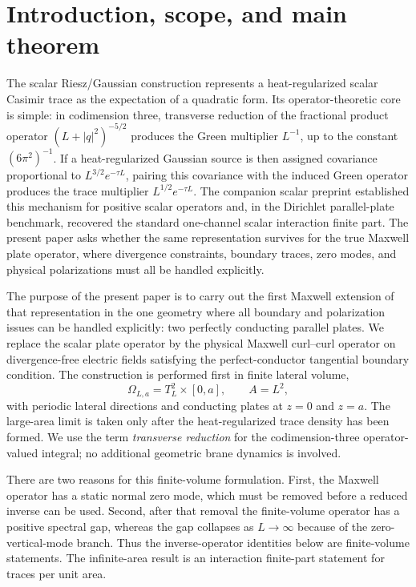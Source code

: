 \documentclass[11pt]{article}
\providecommand{\abs}[1]{\left\lvert #1\right\rvert}
\providecommand{\OmegaLa}{\Omega_{L,a}}
\providecommand{\TtwoL}{T_L^2}
\providecommand{\Aarea}{A}
\numberwithin{equation}{section}
\begin{document}
\section{Introduction, scope, and main theorem}
\label{sec:introduction-scope-theorem}

The scalar Riesz/Gaussian construction represents a heat-regularized scalar
Casimir trace as the expectation of a quadratic form.  Its operator-theoretic
core is simple: in codimension three, transverse reduction of the fractional
product operator \((L+\abs q^2)^{-5/2}\) produces the Green multiplier
\(L^{-1}\), up to the constant \((6\pi^2)^{-1}\).  If a heat-regularized
Gaussian source is then assigned covariance proportional to
\(L^{3/2}e^{-\tau L}\), pairing this covariance with the induced Green
operator produces the trace multiplier \(L^{1/2}e^{-\tau L}\).
The companion scalar preprint \cite{KhanKhan2026Scalar} established this
mechanism for positive scalar operators and, in the Dirichlet parallel-plate
benchmark, recovered the standard one-channel scalar interaction finite part.
The present paper asks whether the same representation survives for the true
Maxwell plate operator, where divergence constraints, boundary traces, zero
modes, and physical polarizations must all be handled explicitly.

The purpose of the present paper is to carry out the first Maxwell extension of
that representation in the one geometry where all boundary and polarization
issues can be handled explicitly: two perfectly conducting parallel plates.  We
replace the scalar plate operator by the physical Maxwell curl--curl operator
on divergence-free electric fields satisfying the perfect-conductor tangential
boundary condition.  The construction is performed first in finite lateral
volume,
\[
    \OmegaLa=\TtwoL\times[0,a],
    \qquad \Aarea=L^2,
\]
with periodic lateral directions and conducting plates at \(z=0\) and
\(z=a\).  The large-area limit is taken only after the heat-regularized trace
density has been formed.  We use the term \emph{transverse reduction} for the
codimension-three operator-valued integral; no additional geometric brane
dynamics is involved.

There are two reasons for this finite-volume formulation.  First, the Maxwell
operator has a static normal zero mode, which must be removed before a reduced
inverse can be used.  Second, after that removal the finite-volume operator has
a positive spectral gap, whereas the gap collapses as \(L\to\infty\) because of
the zero-vertical-mode branch.  Thus the inverse-operator identities below are
finite-volume statements.  The infinite-area result is an interaction
finite-part statement for traces per unit area.
\end{document}
